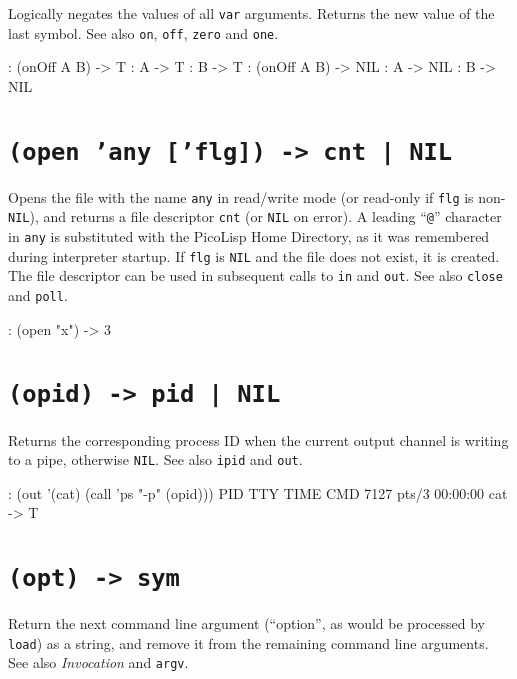 Logically negates the values of all \texttt{var} arguments. Returns the new
value of the last symbol. See also \texttt{on}, \texttt{off}, \texttt{zero} and \texttt{one}.


\begin{wideverbatim}
: (onOff A B)
-> T
: A
-> T
: B
-> T
: (onOff A B)
-> NIL
: A
-> NIL
: B
-> NIL
\end{wideverbatim}

 
\section*{\texttt{(open 'any ['flg]) -> cnt | NIL}}
\label{sec:func-ref-O-(open 'any ['flg]) -> cnt | NIL}


Opens the file with the name \texttt{any} in read/write mode (or read-only if
\texttt{flg} is non-\texttt{NIL}), and returns a file descriptor \texttt{cnt} (or \texttt{NIL} on
error). A leading ``\texttt{@}'' character in \texttt{any} is substituted with the
PicoLisp Home Directory, as it was remembered during interpreter
startup. If \texttt{flg} is \texttt{NIL} and the file does not exist, it is created.
The file descriptor can be used in subsequent calls to \texttt{in} and \texttt{out}.
See also \texttt{close} and \texttt{poll}.


\begin{wideverbatim}
: (open "x")
-> 3
\end{wideverbatim}

 
\section*{\texttt{(opid) -> pid | NIL}}
\label{sec:func-ref-O-(opid) -> pid | NIL}


Returns the corresponding process ID when the current output channel is
writing to a pipe, otherwise \texttt{NIL}. See also \texttt{ipid} and \texttt{out}.


\begin{wideverbatim}
: (out '(cat) (call 'ps "-p" (opid)))
  PID TTY          TIME CMD
 7127 pts/3    00:00:00 cat
-> T
\end{wideverbatim}

 
\section*{\texttt{(opt) -> sym}}
\label{sec:func-ref-O-(opt) -> sym}


Return the next command line argument (``option'', as would be processed
by \texttt{load}) as a string, and remove it from the remaining command line
arguments. See also \emph{Invocation} and \texttt{argv}.


